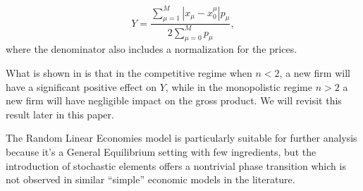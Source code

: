 \begin{equation}
  \label{eq:5}
  Y = \frac{\sum_{\mu = 1}^M |x_\mu - x_0^\mu|p_\mu}{2 \sum_{\mu = 0}^M p_\mu},
\end{equation}
where the denominator also includes a normalization for the prices.

What is shown in \cite{DeMartinoMarsili04} is that in the competitive
regime when $n<2$, a new firm will have a significant positive effect
on $Y$, while in the monopolistic regime $n>2$ a new firm will have
negligible impact on the gross product. We will revisit this result
later in this paper.

The Random Linear Economies model is particularly suitable for further
analysis because it's a General Equilibrium setting with few
ingredients, but the introduction of stochastic elements offers a
nontrivial phase transition which is not observed in similar
``simple'' economic models in the literature.